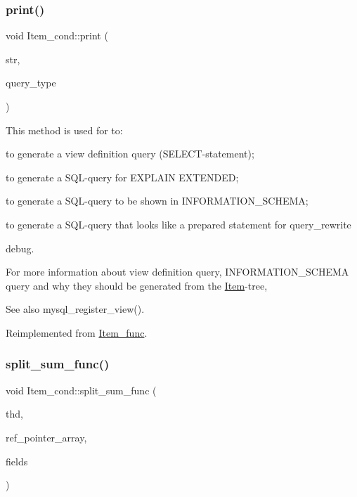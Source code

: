 \subsubsection{\texorpdfstring{print()}{print()}}
{\footnotesize\ttfamily void Item\+\_\+cond\+::print (\begin{DoxyParamCaption}\item[{String $\ast$}]{str,  }\item[{enum\+\_\+query\+\_\+type}]{query\+\_\+type }\end{DoxyParamCaption})\hspace{0.3cm}{\ttfamily [virtual]}}

This method is used for to\+:
\begin{DoxyItemize}
\item to generate a view definition query (S\+E\+L\+E\+CT-\/statement);
\item to generate a S\+QL-\/query for E\+X\+P\+L\+A\+IN E\+X\+T\+E\+N\+D\+ED;
\item to generate a S\+QL-\/query to be shown in I\+N\+F\+O\+R\+M\+A\+T\+I\+O\+N\+\_\+\+S\+C\+H\+E\+MA;
\item to generate a S\+QL-\/query that looks like a prepared statement for query\+\_\+rewrite
\item debug.
\end{DoxyItemize}

For more information about view definition query, I\+N\+F\+O\+R\+M\+A\+T\+I\+O\+N\+\_\+\+S\+C\+H\+E\+MA query and why they should be generated from the \mbox{\hyperlink{classItem}{Item}}-\/tree, \begin{DoxySeeAlso}{See also}
mysql\+\_\+register\+\_\+view(). 
\end{DoxySeeAlso}


Reimplemented from \mbox{\hyperlink{classItem__func_afb302ee25d4721ace27d3f5053d4ee41}{Item\+\_\+func}}.

\mbox{\label{classItem__cond_a50d0f50b6cd2bd3f10281fbe77439445}} 
\subsubsection{\texorpdfstring{split\+\_\+sum\+\_\+func()}{split\_sum\_func()}}
{\footnotesize\ttfamily void Item\+\_\+cond\+::split\+\_\+sum\+\_\+func (\begin{DoxyParamCaption}\item[{T\+HD $\ast$}]{thd,  }\item[{\mbox{\hyperlink{classBounds__checked__array}{Ref\+\_\+ptr\+\_\+array}}}]{ref\+\_\+pointer\+\_\+array,  }\item[{\mbox{\hyperlink{classList}{List}}$<$ \mbox{\hyperlink{classItem}{Item}} $>$ \&}]{fields }\end{DoxyParamCaption})\hspace{0.3cm}{\ttfamily [virtual]}}

